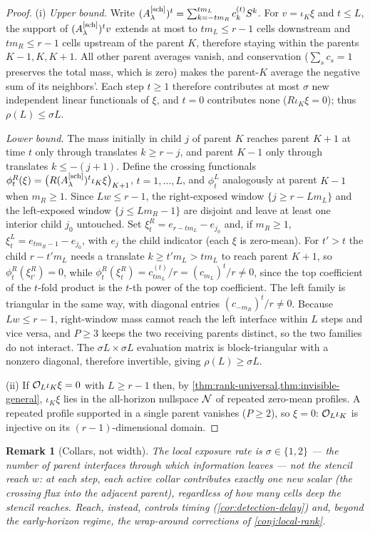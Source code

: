 \documentclass[pdflatex,sn-mathphys-num]{sn-jnl}%
\theoremstyle{thmstyleone}%
\theoremstyle{thmstyletwo}%
\newtheorem{remark}{Remark}%
\theoremstyle{thmstylethree}%
\newcommand{\OL}{{\cal O}_L}
\newcommand{\Asch}{A^{[\rm sch]}_\lambda}
\begin{document}
\begin{proof}
(i) \emph{Upper bound.}
Write $(\Asch)^t=\sum_{k=-tm_R}^{tm_L}c^{(t)}_kS^k$.
For $v=\iota_K\xi$ and $t\le L$, the support of $(\Asch)^tv$ extends at most to $tm_L\le r-1$ cells downstream and $tm_R\le r-1$ cells upstream of the parent $K$, therefore staying within the parents $K-1,K,K+1$.
All other parent averages vanish, and conservation ($\sum_sc_s=1$ preserves the total mass, which is zero) makes the parent-$K$ average the negative sum of its neighbors'.
Each step $t\ge1$ therefore contributes at most $\sigma$ new independent linear functionals of $\xi$, and $t=0$ contributes none ($R\iota_K\xi=0$); thus $\rho(L)\le\sigma L$.

\emph{Lower bound.}
The mass initially in child $j$ of parent $K$ reaches parent $K+1$ at time $t$ only through translates $k\ge r-j$, and parent $K-1$ only through translates $k\le-(j+1)$.
Define the crossing functionals $\phi^R_t(\xi)=\bigl(R(\Asch)^t\iota_K\xi\bigr)_{K+1}$, $t=1,\ldots,L$, and $\phi^L_t$ analogously at parent $K-1$ when $m_R\ge1$.
Since $Lw\le r-1$, the right-exposed window $\{j\ge r-Lm_L\}$ and the left-exposed window $\{j\le Lm_R-1\}$ are disjoint and leave at least one interior child $j_0$ untouched.
Set $\xi^R_t=e_{r-tm_L}-e_{j_0}$ and, if $m_R\ge1$, $\xi^L_t=e_{tm_R-1}-e_{j_0}$, with $e_j$ the child indicator (each $\xi$ is zero-mean).
For $t'>t$ the child $r-t'm_L$ needs a translate $k\ge t'm_L>tm_L$ to reach parent $K+1$, so $\phi^R_t(\xi^R_{t'})=0$, while $\phi^R_t(\xi^R_t)=c^{(t)}_{tm_L}/r=(c_{m_L})^t/r\ne0$, since the top coefficient of the $t$-fold product is the $t$-th power of the top coefficient.
The left family is triangular in the same way, with diagonal entries $(c_{-m_R})^t/r\ne0$.
Because $Lw\le r-1$, right-window mass cannot reach the left interface within $L$ steps and vice versa, and $P\ge3$ keeps the two receiving parents distinct, so the two families do not interact.
The $\sigma L\times\sigma L$ evaluation matrix is block-triangular with a nonzero diagonal, therefore invertible, giving $\rho(L)\ge\sigma L$.

(ii)  If $\OL\iota_K\xi=0$ with $L\ge r-1$ then, by \cref{thm:rank-universal,thm:invisible-general}, $\iota_K\xi$ lies in the all-horizon nullspace ${\cal N}$ of repeated zero-mean profiles.
A repeated profile supported in a single parent vanishes ($P\ge2$), so $\xi=0$: $\OL\iota_K$ is injective on its $(r-1)$-dimensional domain.
\end{proof}

\begin{remark}[Collars, not width]\label{rem:collar-rate}
The local exposure rate is $\sigma\in\{1,2\}$ --- the number of parent interfaces through which information leaves --- not the stencil reach $w$: at each step, each active collar contributes exactly one new scalar (the crossing flux into the adjacent parent), regardless of how many cells deep the stencil reaches.
Reach, instead, controls \emph{timing} (\cref{cor:detection-delay}) and, beyond the early-horizon regime, the wrap-around corrections of \cref{conj:local-rank}.
\end{remark}
\end{document}

